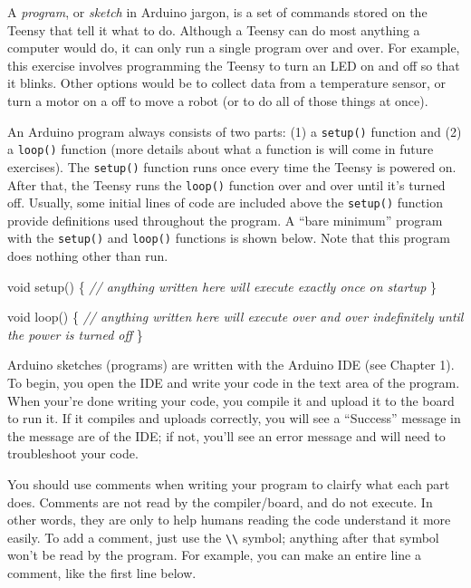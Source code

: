 \documentclass[]{book}
\newenvironment{Shaded}{\begin{snugshade}}{\end{snugshade}}
\newcommand{\CommentTok}[1]{\textcolor[rgb]{0.56,0.35,0.01}{\textit{#1}}}
\newcommand{\DataTypeTok}[1]{\textcolor[rgb]{0.13,0.29,0.53}{#1}}
\newcommand{\NormalTok}[1]{#1}
\begin{document}
A \emph{program}, or \emph{sketch} in Arduino jargon, is a set of commands stored on the Teensy that tell it what to do. Although a Teensy can do most anything a computer would do, it can only run a single program over and over. For example, this exercise involves programming the Teensy to turn an LED on and off so that it blinks. Other options would be to collect data from a temperature sensor, or turn a motor on a off to move a robot (or to do all of those things at once).

An Arduino program always consists of two parts: (1) a \texttt{setup()} function and (2) a \texttt{loop()} function (more details about what a function is will come in future exercises). The \texttt{setup()} function runs once every time the Teensy is powered on. After that, the Teensy runs the \texttt{loop()} function over and over until it's turned off. Usually, some initial lines of code are included above the \texttt{setup()} function provide definitions used throughout the program. A ``bare minimum'' program with the \texttt{setup()} and \texttt{loop()} functions is shown below. Note that this program does nothing other than run.

\begin{Shaded}
\begin{Highlighting}[]
    \DataTypeTok{void}\NormalTok{ setup() \{}
      \CommentTok{// anything written here will execute exactly once on startup}
\NormalTok{    \}}
    
    \DataTypeTok{void}\NormalTok{ loop() \{}
      \CommentTok{// anything written here will execute over and over indefinitely until the power is turned off}
\NormalTok{    \}}
\end{Highlighting}
\end{Shaded}

Arduino sketches (programs) are written with the Arduino IDE (see Chapter 1). To begin, you open the IDE and write your code in the text area of the program. When your're done writing your code, you compile it and upload it to the board to run it. If it compiles and uploads correctly, you will see a ``Success'' message in the message are of the IDE; if not, you'll see an error message and will need to troubleshoot your code.

You should use comments when writing your program to clairfy what each part does. Comments are not read by the compiler/board, and do not execute. In other words, they are only to help humans reading the code understand it more easily. To add a comment, just use the \texttt{\textbackslash{}\textbackslash{}} symbol; anything after that symbol won't be read by the program. For example, you can make an entire line a comment, like the first line below.
\end{document}
